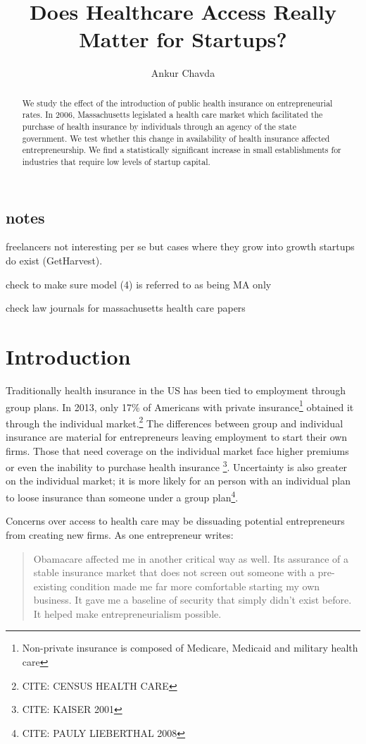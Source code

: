 \documentclass[12pt]{article}
\title{Does Healthcare Access Really Matter for Startups?}
\author{Ankur Chavda}
\begin{document}
\maketitle

\begin{abstract}
We study the effect of the introduction of public health insurance on entrepreneurial rates. In 2006, Massachusetts legislated a health care market which facilitated the purchase of health insurance by individuals through an agency of the state government. We test whether this change in availability of health insurance affected entrepreneurship. We find a statistically significant increase in small establishments for industries that require low levels of startup capital.
\end{abstract}

\subsection{notes}

freelancers not interesting per se but cases where they grow into growth startups do exist (GetHarvest). 

check to make sure model (4) is referred to as being MA only

check law journals for massachusetts health care papers

\section{Introduction}
Traditionally health insurance in the US has been tied to employment through group plans. In 2013, only 17\% of Americans with private insurance\footnote{Non-private insurance is composed of Medicare, Medicaid and military health care} obtained it through the individual market.\footnote{CITE: CENSUS HEALTH CARE} The differences between group and individual insurance are material for entrepreneurs leaving employment to start their own firms. Those that need coverage on the individual market face higher premiums or even the inability to purchase health insurance \footnote{CITE: KAISER 2001}. Uncertainty is also greater on the individual market; it is more likely for an person with an individual plan to loose insurance than someone under a group plan\footnote{CITE: PAULY LIEBERTHAL 2008}. 

Concerns over access to health care may be dissuading potential entrepreneurs from creating new firms. As one entrepreneur writes:
\begin{quote}
Obamacare affected me in another critical way as well. Its assurance of a stable insurance market that does not screen out someone with a pre-existing condition made me far more comfortable starting my own business. It gave me a baseline of security that simply didn't exist before. It helped make entrepreneurialism possible. \cite{sullivan}
\end{quote}
\end{document}
